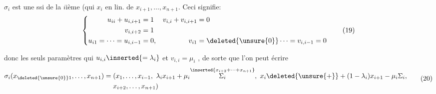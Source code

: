 $\sigma_i$ est une  ssi  de la $i$ième (qui  $x_i$ en  lin. de $x_{i+1},\ldots,x_{n+1}$. Ceci signifie:
\[
\left\{\begin{aligned}
u_{ii}+u_{i,i+1}&=1&v_{i,i}+v_{i,i+1}&=0\\
v_{i,i+2}&=1\\
u_{i1}=\cdots=u_{i,i-1}&=0,&v_{i1}&=\deleted{\unsure{0}}\cdots=v_{i,i-1}=0
\end{aligned}\right.
\tag*{(19)}
\]

donc les seuls paramètres qui   $u_{i,i}\inserted{=\lambda_i}$ et $v_{i,i}=\mu_i$ , de sorte que l'on peut écrire
\[
\begin{aligned}
\sigma_i(x_{\deleted{\unsure{0}}1},\ldots,x_{n+1})={}&(x_1,\ldots,x_{i-1},\ \lambda_i x_{i+1}+\mu_i\overset{\inserted{x_{i+2}+\cdots+x_{n+1}}}{\Sigma_i},\ x_i\deleted{\unsure{+}}+(1-\lambda_i)x_{i+1}-\mu_i\Sigma_i,\\
&x_{i+2},\ldots,x_{n+1})
\end{aligned}
\tag*{(20)}
\]
